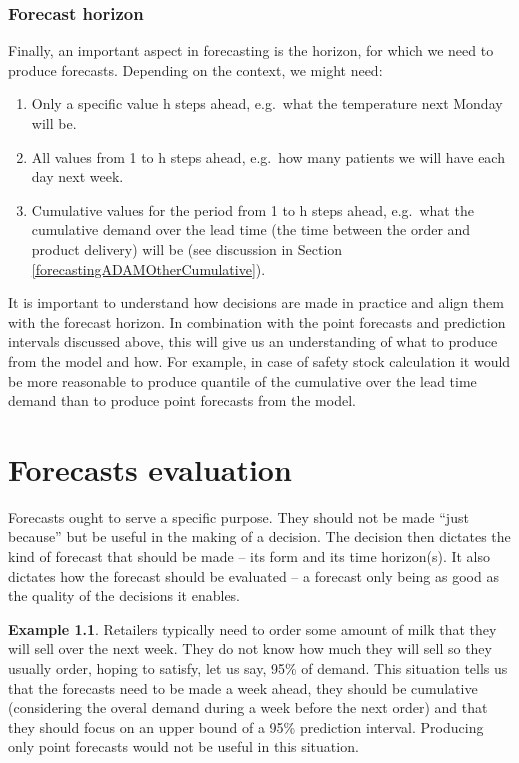 \documentclass[
]{book}
\providecommand{\tightlist}{%
  \setlength{\itemsep}{0pt}\setlength{\parskip}{0pt}}
\theoremstyle{definition}
\theoremstyle{definition}
\newtheorem{example}{Example}[chapter]
\theoremstyle{definition}
\theoremstyle{definition}
\theoremstyle{remark}
\begin{document}
\hypertarget{forecast-horizon}{%
\subsection{Forecast horizon}\label{forecast-horizon}}

Finally, an important aspect in forecasting is the horizon, for which we need to produce forecasts. Depending on the context, we might need:

\begin{enumerate}
\def\labelenumi{\arabic{enumi}.}
\tightlist
\item
  Only a specific value h steps ahead, e.g.~what the temperature next Monday will be.
\item
  All values from 1 to h steps ahead, e.g.~how many patients we will have each day next week.
\item
  Cumulative values for the period from 1 to h steps ahead, e.g.~what the cumulative demand over the lead time (the time between the order and product delivery) will be (see discussion in Section \ref{forecastingADAMOtherCumulative}).
\end{enumerate}

It is important to understand how decisions are made in practice and align them with the forecast horizon. In combination with the point forecasts and prediction intervals discussed above, this will give us an understanding of what to produce from the model and how. For example, in case of safety stock calculation it would be more reasonable to produce quantile of the cumulative over the lead time demand than to produce point forecasts from the model.

\hypertarget{forecastsEvaluation}{%
\chapter{Forecasts evaluation}\label{forecastsEvaluation}}

Forecasts ought to serve a specific purpose. They should not be made ``just because'' but be useful in the making of a decision. The decision then dictates the kind of forecast that should be made -- its form and its time horizon(s). It also dictates how the forecast should be evaluated -- a forecast only being as good as the quality of the decisions it enables.

\begin{example}
\protect\hypertarget{exm:unnamed-chunk-4}{}{\label{exm:unnamed-chunk-4} }Retailers typically need to order some amount of milk that they will sell over the next week. They do not know how much they will sell so they usually order, hoping to satisfy, let us say, 95\% of demand. This situation tells us that the forecasts need to be made a week ahead, they should be cumulative (considering the overal demand during a week before the next order) and that they should focus on an upper bound of a 95\% prediction interval. Producing only point forecasts would not be useful in this situation.
\end{example}
\end{document}
